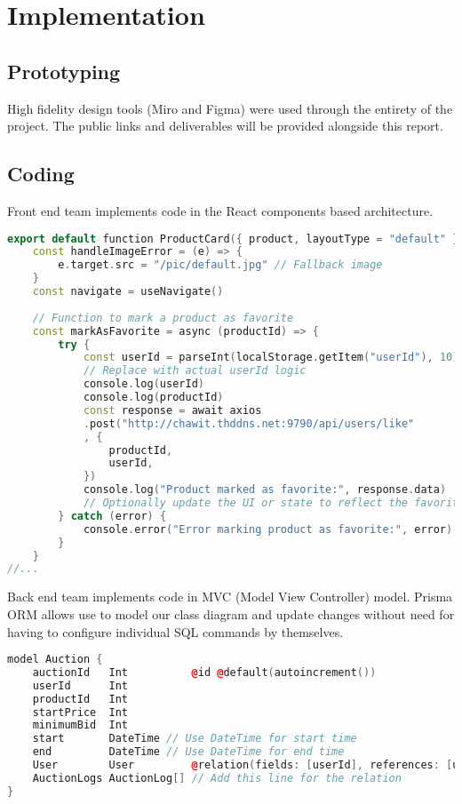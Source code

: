 %
%
\chapter{Implementation}

\section{Prototyping}

High fidelity design tools (Miro and Figma) were used through the entirety of the project. The public links and deliverables will be provided alongside this report.

\section{Coding}

Front end team implements code in the React components based architecture.

\begin{lstlisting}[language=C++, caption={React Based Components example (View for MVC architecture)}]
export default function ProductCard({ product, layoutType = "default" }) {
	const handleImageError = (e) => {
		e.target.src = "/pic/default.jpg" // Fallback image
	}
	const navigate = useNavigate()
	
	// Function to mark a product as favorite
	const markAsFavorite = async (productId) => {
		try {
			const userId = parseInt(localStorage.getItem("userId"), 10) 
			// Replace with actual userId logic
			console.log(userId)
			console.log(productId)
			const response = await axios
			.post("http://chawit.thddns.net:9790/api/users/like"
			, {
				productId,
				userId,
			})
			console.log("Product marked as favorite:", response.data)
			// Optionally update the UI or state to reflect the favorite status
		} catch (error) {
			console.error("Error marking product as favorite:", error)
		}
	}
//...
\end{lstlisting}


Back end team implements code in MVC (Model View Controller) model. Prisma ORM allows use to model our class diagram and update changes without need for having to configure individual SQL commands by themselves.

\begin{lstlisting}[language=C++, caption={Model for MVC architecture}]
model Auction {
	auctionId   Int          @id @default(autoincrement())
	userId      Int
	productId   Int
	startPrice  Int
	minimumBid  Int
	start       DateTime // Use DateTime for start time
	end         DateTime // Use DateTime for end time
	User        User         @relation(fields: [userId], references: [userId])
	AuctionLogs AuctionLog[] // Add this line for the relation
}
\end{lstlisting}


